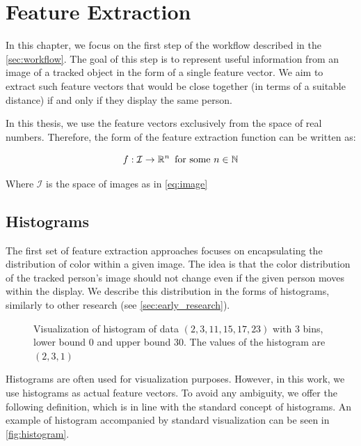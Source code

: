 \chapter{Feature Extraction}


\label{ch:features}

In this chapter, we focus on the first step of the workflow described in the \autoref{sec:workflow}. The goal of this step is to represent useful information from an image of a tracked object in the form of a single feature vector. We aim to extract such feature vectors that would be close together (in terms of a suitable distance) if and only if they display the same person.

In this thesis, we use the feature vectors exclusively from the space of real numbers. Therefore, the form of the feature extraction function can be written as:

$$f : \mathcal{I} \rightarrow \mathbb{R}^n \, \text{ for some } n \in \mathbb{N}$$

Where $\mathcal{I}$ is the space of images as in \autoref{eq:image}

\section{Histograms}

\label{sec:histograms}

The first set of feature extraction approaches focuses on encapsulating the distribution of color within a given image. The idea is that the color distribution of the tracked person's image should not change even if the given person moves within the display. We describe this distribution in the forms of histograms, similarly to other research (see \autoref{sec:early_research}).

\begin{figure}
    \centering
    \def\svgwidth{\columnwidth}
    \scalebox{0.6}{}
    \caption[Visualization of histogram of data]{Visualization of histogram of data $(2, 3, 11, 15, 17, 23)$ with 3 bins, lower bound 0 and upper bound 30. The values of the histogram are $(2, 3, 1)$}
    \label{fig:histogram}
\end{figure}

Histograms are often used for visualization purposes. However, in this work, we use histograms as actual feature vectors. To avoid any ambiguity, we offer the following definition, which is in line with the standard concept of histograms. An example of histogram accompanied by standard visualization can be seen in \autoref{fig:histogram}.

